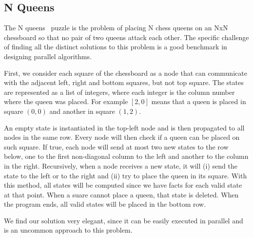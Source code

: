 \subsection{N Queens}

The N queens~\cite{8queens} puzzle is the problem of placing N chess queens on an NxN chessboard so
that no pair of two queens attack each other. The specific challenge of finding all the distinct
solutions to this problem is a good benchmark in designing parallel algorithms.

First, we consider each square of the chessboard as a node
that can communicate with the adjacent left, right and bottom squares, but not top square.
The states are represented as a list of integers, where each integer is the column number where
the queen was placed. For example $[2, 0]$ means that a queen is placed in square $(0, 0)$ and another in square $(1, 2)$.

An empty state is instantiated in the top-left node and is then propagated to all nodes in the same row.
Every node will then check if a queen can be placed on such square. If true, each node will send at most
two new states to the row below, one to the first non-diagonal column to the left and another to the column
in the right.
Recursively, when a node receives a new state, it will (i) send the state to the left
or to the right and (ii) try to place the queen in its square. With this method,
all states will be computed since we have facts for each valid state
at that point. When a suare cannot place a queen, that state is deleted.
When the program ends, all valid states will be placed in the bottom row.

We find our solution very elegant, since it can be easily executed in parallel and is an uncommon
approach to this problem.

